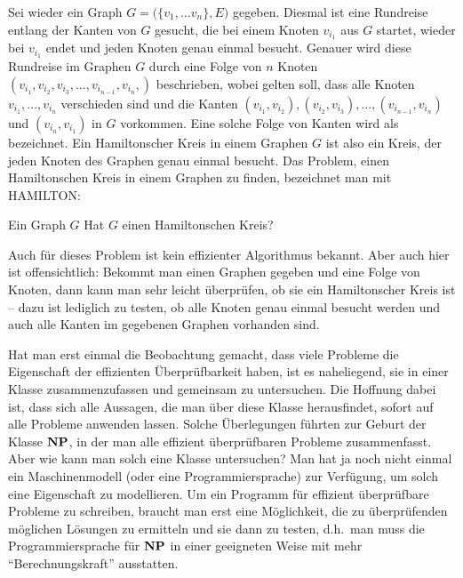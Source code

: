 Sei wieder ein Graph $G = \bigl(\{v_1, \dots v_n \},E\bigr)$
gegeben. Diesmal ist eine Rundreise entlang der Kanten von $G$
gesucht, die bei einem Knoten $v_{i_1}$ aus $G$ startet, wieder bei
$v_{i_1}$ endet und jeden Knoten genau einmal besucht. Genauer wird
diese Rundreise im Graphen $G$ durch eine Folge von $n$ Knoten
$(v_{i_1}, v_{i_2}, v_{i_3}, \dots ,v_{i_{n-1}}, v_{i_{n}},)$
beschrieben, wobei gelten soll, dass alle Knoten
$v_{i_1},\dots,v_{i_n}$ verschieden sind und die Kanten $(v_{i_1},
v_{i_2}),\allowbreak (v_{i_2}, v_{i_3}),\allowbreak \dots
,(v_{i_{n-1}}, v_{i_{n}})$ und $(v_{i_{n}}, v_{i_1})$ in $G$
vorkommen. Eine solche Folge von Kanten wird als  bezeichnet. Ein Hamiltonscher Kreis in einem Graphen $G$ ist
also ein Kreis, der jeden Knoten des Graphen genau einmal besucht.
Das Problem, einen Hamiltonschen Kreis in einem Graphen zu finden,
bezeichnet man mit \textsf{HAMILTON}:

{Ein Graph $G$}
{Hat $G$ einen Hamiltonschen Kreis?}

Auch für dieses Problem ist kein effizienter Algorithmus bekannt. Aber
auch hier ist offensichtlich: Bekommt man einen Graphen gegeben und
eine Folge von Knoten, dann kann man sehr leicht überprüfen, ob sie
ein Hamiltonscher Kreis ist -- dazu ist lediglich zu testen, ob alle
Knoten genau einmal besucht werden und auch alle Kanten im gegebenen
Graphen vorhanden sind.

Hat man erst einmal die Beobachtung gemacht, dass viele Probleme die
Eigenschaft der effizienten Überprüfbarkeit haben, ist es naheliegend,
sie in einer Klasse zusammenzufassen und gemeinsam zu untersuchen. Die
Hoffnung dabei ist, dass sich alle Aussagen, die man über diese Klasse
herausfindet, sofort auf alle Probleme anwenden lassen. Solche
Überlegungen führten zur Geburt der Klasse $\mathbf{N}\mathbf{P}$, in der man alle
effizient überprüfbaren Probleme zusammenfasst. Aber wie kann man
solch eine Klasse untersuchen? Man hat ja noch nicht einmal ein
Maschinenmodell (oder eine Programmiersprache) zur Verfügung, um solch
eine Eigenschaft zu modellieren. Um ein Programm für effizient
überprüfbare Probleme zu schreiben, braucht man erst eine Möglichkeit,
die zu überprüfenden möglichen Lösungen zu ermitteln und sie dann zu
testen, d.h.~man muss die Programmiersprache für $\mathbf{N}\mathbf{P}$ in einer
geeigneten Weise mit mehr "`Berechnungskraft"' ausstatten.

